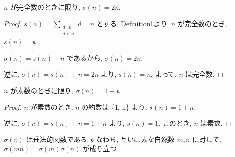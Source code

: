 \begin{lemma}\label{perfect_iff_sum_divisors_eq_two_mul}
\leanok{}
\(n\) が完全数のときに限り, \(\sigma(n) = 2n\).
\end{lemma}

\begin{proof}
\(s(n) = \sum_{\substack{d \mid n\\ d < n}} d = n\) とする.
Definition1より, \(n\) が完全数のとき, \(s(n) = n\).

\(\sigma(n) = s(n) + n\) であるから, \(\sigma(n) = 2n\).

逆に, \(\sigma(n) = s(n) + n = 2n\) より, \(s(n) = n\).
よって, \(n\) は完全数.
\end{proof}

\begin{lemma}\label{prime_iff_sum_divisors_eq_succ}
\leanok{}
\(n\) が素数のときに限り, \(\sigma(n) =  1 + n\).
\end{lemma}

\begin{proof}
\(n\) が素数のとき, \(n\) の約数は \{1, n\} より, \(\sigma(n) = 1 + n\).

逆に, \(\sigma(n) = s(n) + n = 1 + n\) より, \(s(n) = 1\).
このとき, \(n\) は素数.
\end{proof}

\begin{lemma}\label{isMultiplicative}\leanok{}
\(\sigma(n)\) は乗法的関数である.すなわち, 互いに素な自然数 \(m, n\) に対して,
\(\sigma(mn) = \sigma(m)\sigma(n)\) が成り立つ.
\end{lemma}

